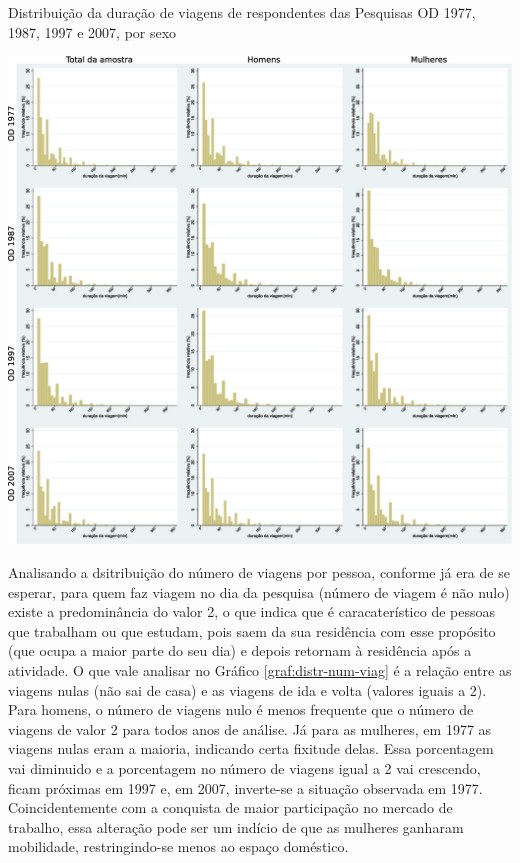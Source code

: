 \begin{grafico}[htb]%
    \caption{\label{graf:distr-dur-viag}Distribuição da duração de viagens de respondentes das Pesquisas OD 1977, 1987, 1997 e 2007, por sexo}%
    \begin{center}%
        \includegraphics[width=1.1\textwidth]{./imagens/duradeviagens2.eps}%
    \end{center}%
\end{grafico}%

\clearpage
Analisando a dsitribuição do número de viagens por pessoa, conforme já era de se esperar, para quem faz viagem no dia da pesquisa (número de viagem é não nulo) existe a predominância do valor 2, o que indica que é caracaterístico de pessoas que trabalham ou que estudam, pois saem da sua residência com esse propósito (que ocupa a maior parte do seu dia) e depois retornam à residência após a atividade. O que vale analisar no Gráfico \ref{graf:distr-num-viag} é a relação entre as viagens nulas (não sai de casa) e as viagens de ida e volta (valores iguais a 2). Para homens, o número de viagens nulo é menos frequente que o número de viagens de valor 2 para todos anos de análise. Já para as mulheres, em 1977 as viagens nulas eram a maioria, indicando certa fixitude delas. Essa porcentagem vai diminuido e a porcentagem no número de viagens igual a 2 vai crescendo, ficam próximas em 1997 e, em 2007, inverte-se a situação observada em 1977. Coincidentemente com a conquista de maior participação no mercado de trabalho, essa alteração pode ser um indício de que as mulheres ganharam mobilidade, restringindo-se menos ao espaço doméstico.

